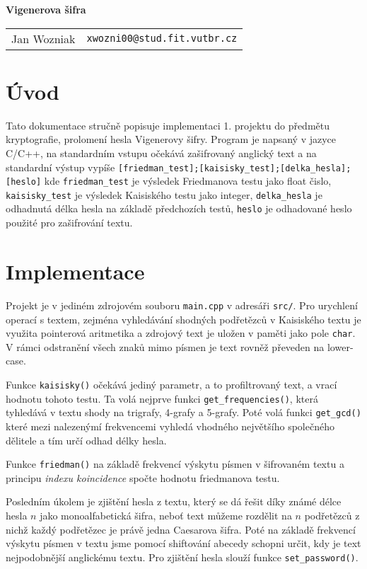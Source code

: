 \documentclass[a4paper,11pt]{article}
\begin{document}
\begin{center}{\LARGE\textbf{Vigenerova šifra}}\\[0.2cm]
\newcommand{\autor}[2]{#1&\texttt{#2@stud.fit.vutbr.cz}\tabularnewline}
\begin{tabular}{ll}
    \autor{Jan Wozniak}{xwozni00}
\end{tabular}
\end{center}


\section{Úvod}

Tato dokumentace stručně popisuje implementaci 1. projektu do předmětu kryptografie, prolomení hesla Vigenerovy šifry.
Program je napsaný v jazyce C/C++, na standardním vstupu očekává zašifrovaný anglický text a na standardní výstup vypíše
\texttt{[friedman\_test];[kaisisky\_test];[delka\_hesla];[heslo]} kde \texttt{friedman\_test} je výsledek Friedmanova
testu jako float čislo, \texttt{kaisisky\_test} je výsledek Kaisiského testu jako integer,
\texttt{delka\_hesla} je odhadnutá délka hesla na základě předchozích testů, \texttt{heslo} je odhadované heslo použité pro
zašifrování textu.

\section{Implementace}
Projekt je v jediném zdrojovém souboru \texttt{main.cpp} v adresáři \texttt{src/}. Pro urychlení operací s textem, zejména
vyhledávání shodných podřetězců v Kaisiského textu je využita pointerová aritmetika a zdrojový text je uložen v paměti jako
pole \texttt{char}. V rámci odstranění všech znaků mimo písmen je text rovněž převeden na lower-case.

Funkce \texttt{kaisisky()} očekává jediný parametr, a to profiltrovaný text, a vrací hodnotu tohoto testu. Ta volá nejprve
funkci \texttt{get\_frequencies()}, která tyhledává v textu shody na trigrafy, 4-grafy a 5-grafy. Poté volá funkci \texttt{get\_gcd()}
které mezi nalezenýmí frekvencemi vyhledá vhodného největšího společného dělitele a tím určí odhad délky hesla.

Funkce \texttt{friedman()} na základě frekvencí výskytu písmen v šifrovaném textu a principu \textit{indexu koincidence} 
spočte hodnotu friedmanova testu.

Posledním úkolem je zjištění hesla z textu, který se dá řešit díky známé délce hesla $n$ jako monoalfabetická šifra, neboť
text můžeme rozdělit na $n$ podřetězců z nichž každý podřetězec je právě jedna Caesarova šifra. Poté na základě frekvencí
výskytu písmen v textu jsme pomocí shiftování abecedy schopni určit, kdy je text nejpodobnější anglickému textu. Pro zjištění hesla
slouží funkce \texttt{set\_password()}.
\end{document}
